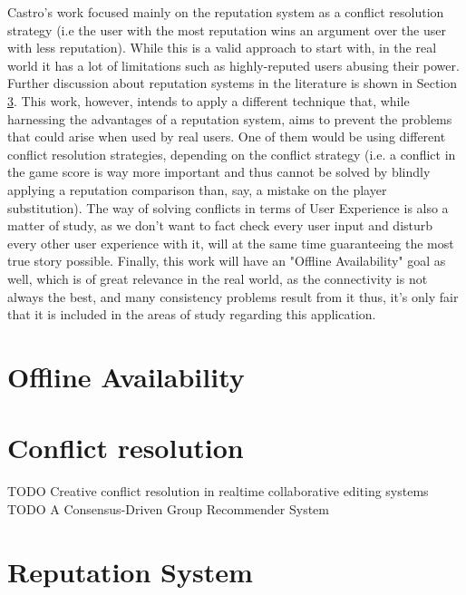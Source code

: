Castro's work focused mainly on the reputation system as a conflict resolution strategy (i.e the user with the most reputation wins an argument over the user with less reputation). While this is a valid approach to start with, in the real world it has a lot of limitations such as highly-reputed users abusing their power. Further discussion about reputation systems in the literature is shown in Section \ref{sec:rep-sys-sota}. This work, however, intends to apply a different technique that, while harnessing the advantages of a reputation system, aims to prevent the problems that could arise when used by real users. One of them would be using different conflict resolution strategies, depending on the conflict strategy (i.e. a conflict in the game score is way more important and thus cannot be solved by blindly applying a reputation comparison than, say, a mistake on the player substitution). The way of solving conflicts in terms of User Experience is also a matter of study, as we don't want to fact check every user input and disturb every other user experience with it, will at the same time guaranteeing the most true story possible. Finally, this work will have an "Offline Availability" goal as well, which is of great relevance in the real world, as the connectivity is not always the best, and many consistency problems result from it thus, it's only fair that it is included in the areas of study regarding this application.

\section{Offline Availability}\label{sec:offline-avail-sota}

\section{Conflict resolution}\label{sec:conflict-res-sota}

TODO Creative conflict resolution in realtime collaborative editing systems
TODO A Consensus-Driven Group Recommender System

\section{Reputation System}\label{sec:rep-sys-sota}

